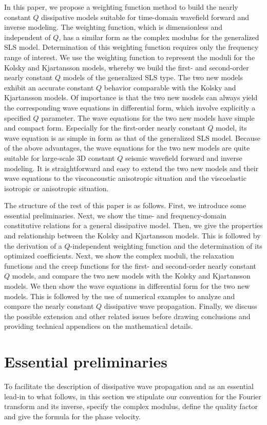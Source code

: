 \documentclass[article]{./macros/elsarticle_qh}
\begin{document}
In this paper, we propose a weighting function method to build the nearly constant $Q$ dissipative models suitable for time-domain wavefield forward and inverse modeling. The weighting function, which is dimensionless and independent of $Q$, has a similar form as the complex modulus for the generalized SLS model. Determination of this weighting function requires only the frequency range of interest. We use the weighting function to represent the moduli for the Kolsky and Kjartansson models, whereby we build the first- and second-order nearly constant $Q$ models of the generalized SLS type. The two new models exhibit an accurate constant $Q$ behavior comparable with the Kolsky and Kjartansson models. Of importance is that the two new models can always yield the corresponding wave equations in differential form, which involve explicitly a specified $Q$ parameter. The wave equations for the two new models have simple and compact form. Especially for the first-order nearly constant $Q$ model, its wave equation is as simple in form as that of the generalized SLS model. Because of the above advantages, the wave equations for the two new models are quite suitable for large-scale 3D constant $Q$ seismic wavefield forward and inverse modeling. It is straightforward and easy to extend the two new models and their wave equations to the viscoacoustic anisotropic situation and the viscoelastic isotropic or anisotropic situation.

The structure of the rest of this paper is as follows. First, we introduce some essential preliminaries. Next, we show the time- and frequency-domain constitutive relations for a general dissipative model. Then, we give the properties and relationship between the Kolsky and Kjartansson models. This is followed by the derivation of a $Q$-independent weighting function and the determination of its optimized coefficients. Next, we show the complex moduli, the relaxation functions and the creep functions for the first- and second-order nearly constant $Q$ models, and compare the two new models with the Kolsky and Kjartansson models. We then show the wave equations in differential form for the two new models. This is followed by the use of numerical examples to analyze and compare the nearly constant $Q$ dissipative wave propagation. Finally, we discuss the possible extension and other related issues before drawing conclusions and providing technical appendices on the mathematical details. 

\section{Essential preliminaries}
To facilitate the description of dissipative wave propagation and as an essential lead-in to what follows, in this section we stipulate our convention for the Fourier transform and its inverse, specify the complex modulus, define the quality factor and give the formula for the phase velocity. 
\end{document}
